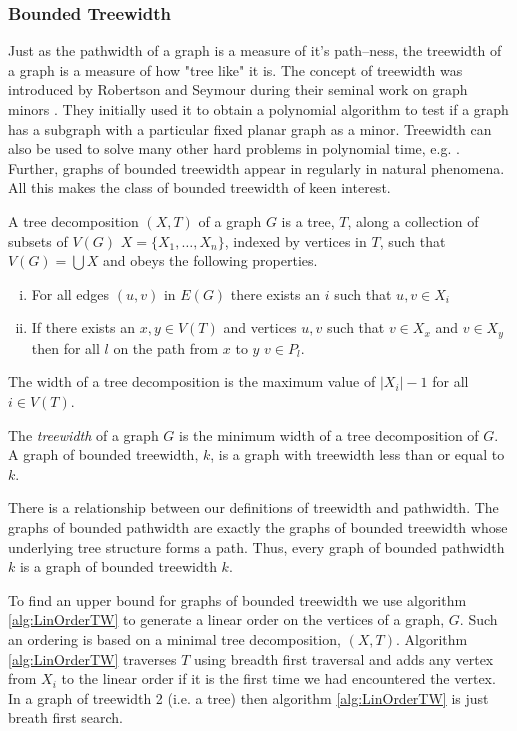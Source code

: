 \subsubsection{Bounded Treewidth}

Just as the pathwidth of a graph is a measure of it's path--ness, the treewidth of a graph is a measure of how "tree like" it is. The concept of treewidth was introduced by Robertson and Seymour during their seminal work on graph minors \cite{robertson1986graph}. They initially used it to obtain a polynomial algorithm to test if a graph has a subgraph with a particular fixed planar graph as a minor. Treewidth can also be used to solve many other hard problems in polynomial time, e.g. \cite{bodlaender1988dynamic}.
Further, graphs of bounded treewidth appear in regularly in natural phenomena. All this makes the class of bounded treewidth of keen interest.

\begin{definition}
    A tree decomposition $(X,T)$ of a graph $G$ is a tree, $T$, along a collection of subsets of $V(G)$ $X=\{X_1,\dots,X_n\}$, indexed by vertices in $T$, such that $V(G)=\bigcup X$ and obeys the following properties.
    \begin{enumerate}[(i)]
        \item For all edges $(u,v)$ in $E(G)$ there exists an $i$ such that $u,v\in X_i$
        \item  If there exists an $x,y\in V(T)$ and vertices $u,v$ such that $v\in X_x$ and $v\in X_y$ then for all $l$ on the path from $x$ to $y$ $v\in P_l$.
    \end{enumerate} 
    The width of a tree decomposition is the maximum value of $|X_i| -1$ for all $i\in V(T)$.
\end{definition}

\begin{definition}[Treewidth]
    The \textit{treewidth} of a graph $G$ is the minimum width of a tree decomposition of $G$.    
    A graph of bounded treewidth, $k$, is a graph with treewidth less than or equal to $k$. 
\end{definition}

There is a relationship between our definitions of treewidth and pathwidth. The graphs of bounded pathwidth are exactly the graphs of bounded treewidth whose underlying tree structure forms a path. Thus, every graph of bounded pathwidth $k$ is a graph of bounded treewidth $k$. 

To find an upper bound for graphs of bounded treewidth we use algorithm \ref{alg:LinOrderTW} to generate a linear order on the vertices of a graph, $G$. Such an ordering is based on a minimal tree decomposition, $(X,T)$. Algorithm \ref{alg:LinOrderTW} traverses $T$ using breadth first traversal and adds any vertex from $X_i$ to the linear order if it is the first time we  had encountered the vertex. In a graph of treewidth 2 (i.e. a tree) then algorithm \ref{alg:LinOrderTW} is just breath first search.

